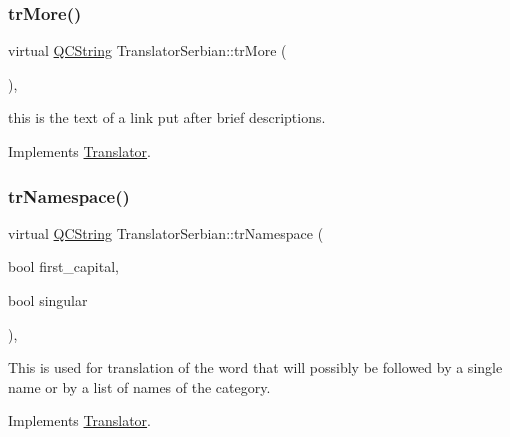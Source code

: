\mbox{\label{class_translator_serbian_ac7995605321e0fdbbd9d8c28cfc58f82}} 
\subsubsection{\texorpdfstring{trMore()}{trMore()}}
{\footnotesize\ttfamily virtual \mbox{\hyperlink{class_q_c_string}{Q\+C\+String}} Translator\+Serbian\+::tr\+More (\begin{DoxyParamCaption}{ }\end{DoxyParamCaption})\hspace{0.3cm}{\ttfamily [inline]}, {\ttfamily [virtual]}}

this is the text of a link put after brief descriptions. 

Implements \mbox{\hyperlink{class_translator}{Translator}}.

\mbox{\label{class_translator_serbian_a3f2c6a5a298660730c41a48913e0a74e}} 
\subsubsection{\texorpdfstring{trNamespace()}{trNamespace()}}
{\footnotesize\ttfamily virtual \mbox{\hyperlink{class_q_c_string}{Q\+C\+String}} Translator\+Serbian\+::tr\+Namespace (\begin{DoxyParamCaption}\item[{bool}]{first\+\_\+capital,  }\item[{bool}]{singular }\end{DoxyParamCaption})\hspace{0.3cm}{\ttfamily [inline]}, {\ttfamily [virtual]}}

This is used for translation of the word that will possibly be followed by a single name or by a list of names of the category. 

Implements \mbox{\hyperlink{class_translator}{Translator}}.

\mbox{\label{class_translator_serbian_a02e4a66d267c2e9e5d3af7e983a0a8a5}} 
